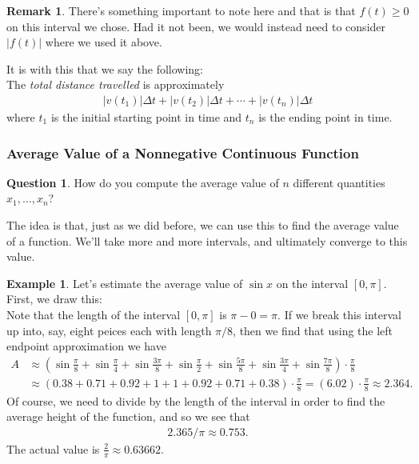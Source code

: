 \documentclass[leqno]{article}
\theoremstyle{definition}
\newtheorem{remark}{Remark}[section]
\newtheorem{example}{Example}[section]
\newtheorem{question}{Question}[section]
\theoremstyle{remark}
\theoremstyle{theorem}
\begin{document}
\begin{remark}
There's something important to note here and that is that $f(t)\geq 0$ on this interval we chose.  Had it not been, we would instead need to consider $|f(t)|$ where we used it above.
\end{remark}

It is with this that we say the following:\\
\noindent The \emph{total distance travelled} is approximately
\begin{align*}
|v(t_1)|\Delta t + |v(t_2)|\Delta t + \cdots + |v(t_n)|\Delta t
\end{align*}
where $t_1$ is the initial starting point in time and $t_n$ is the ending point in time.

\subsubsection{Average Value of a Nonnegative Continuous Function}

\begin{question}
How do you compute the average value of $n$ different quantities $x_1,\dots,x_n$?
\vspace*{2cm}\\
\end{question}

The idea is that, just as we did before, we can use this to find the average value of a function.  We'll take more and more intervals, and ultimately converge to this value. 

\begin{example}
Let's estimate the average value of $\sin x$ on the interval $[0,\pi]$.  First, we draw this:
\vspace*{4cm}\\
Note that the length of the interval $[0,\pi]$ is $\pi-0=\pi$.  If we break this interval up into, say, eight peices each with length $\pi/8$, then we find that using the left endpoint approximation we have
\begin{align*}
A& \approx \left( \sin \frac{\pi}{8} + \sin \frac{\pi}{4} + \sin \frac{3\pi}{8} + \sin \frac{\pi}{2} + \sin \frac{5\pi}{8} + \sin \frac{3\pi}{4} + \sin \frac{7\pi}{8} \right) \cdot \frac{\pi}{8}\\
&\approx (0.38+0.71+0.92+1+1+0.92+0.71+0.38)\cdot \frac{\pi}{8} = (6.02)\cdot \frac{\pi}{8} \approx 2.364.
\end{align*}
Of course, we need to divide by the length of the interval in order to find the average height of the function, and so we see that
\begin{align*}
2.365/\pi \approx 0.753.
\end{align*}
The actual value is $\frac{2}{\pi}\approx 0.63662.$
\end{example}
\end{document}
